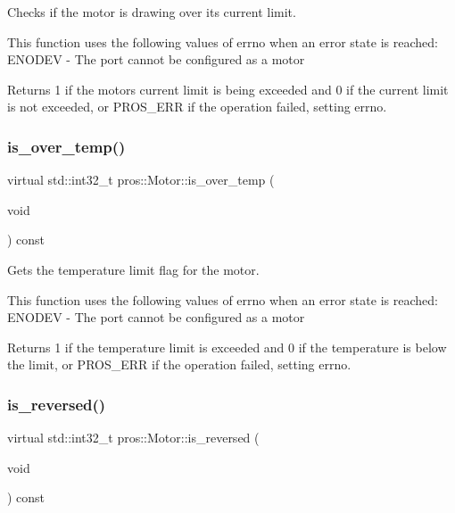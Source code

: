 Checks if the motor is drawing over its current limit. 

This function uses the following values of errno when an error state is reached\+: E\+N\+O\+D\+EV -\/ The port cannot be configured as a motor

\begin{DoxyReturn}{Returns}
1 if the motor\textquotesingle{}s current limit is being exceeded and 0 if the current limit is not exceeded, or P\+R\+O\+S\+\_\+\+E\+RR if the operation failed, setting errno. 
\end{DoxyReturn}
\mbox{\label{classpros_1_1Motor_a099d50ed35d73fa29a46b2beb151ce2b}} 
\subsubsection{\texorpdfstring{is\+\_\+over\+\_\+temp()}{is\_over\_temp()}}
{\footnotesize\ttfamily virtual std\+::int32\+\_\+t pros\+::\+Motor\+::is\+\_\+over\+\_\+temp (\begin{DoxyParamCaption}\item[{void}]{ }\end{DoxyParamCaption}) const\hspace{0.3cm}{\ttfamily [virtual]}}



Gets the temperature limit flag for the motor. 

This function uses the following values of errno when an error state is reached\+: E\+N\+O\+D\+EV -\/ The port cannot be configured as a motor

\begin{DoxyReturn}{Returns}
1 if the temperature limit is exceeded and 0 if the temperature is below the limit, or P\+R\+O\+S\+\_\+\+E\+RR if the operation failed, setting errno. 
\end{DoxyReturn}
\mbox{\label{classpros_1_1Motor_a5122faa60ef7745761eca847192560c5}} 
\subsubsection{\texorpdfstring{is\+\_\+reversed()}{is\_reversed()}}
{\footnotesize\ttfamily virtual std\+::int32\+\_\+t pros\+::\+Motor\+::is\+\_\+reversed (\begin{DoxyParamCaption}\item[{void}]{ }\end{DoxyParamCaption}) const\hspace{0.3cm}{\ttfamily [virtual]}}



